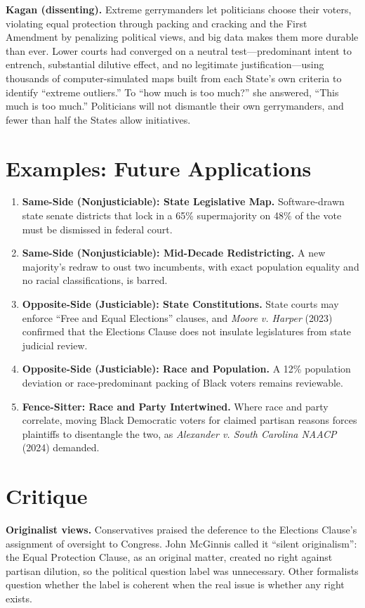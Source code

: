 \documentclass[12pt]{article}
\begin{document}
\textbf{Kagan (dissenting).} Extreme gerrymanders let politicians choose their voters, violating equal protection through packing and cracking and the First Amendment by penalizing political views, and big data makes them more durable than ever. Lower courts had converged on a neutral test---predominant intent to entrench, substantial dilutive effect, and no legitimate justification---using thousands of computer-simulated maps built from each State's own criteria to identify ``extreme outliers.'' To ``how much is too much?'' she answered, ``This much is too much.'' Politicians will not dismantle their own gerrymanders, and fewer than half the States allow initiatives.

\section{Examples: Future Applications}

\begin{enumerate}
\item \textbf{Same-Side (Nonjusticiable): State Legislative Map.} Software-drawn state senate districts that lock in a 65\% supermajority on 48\% of the vote must be dismissed in federal court.
\item \textbf{Same-Side (Nonjusticiable): Mid-Decade Redistricting.} A new majority's redraw to oust two incumbents, with exact population equality and no racial classifications, is barred.
\item \textbf{Opposite-Side (Justiciable): State Constitutions.} State courts may enforce ``Free and Equal Elections'' clauses, and \textit{Moore v. Harper} (2023) confirmed that the Elections Clause does not insulate legislatures from state judicial review.
\item \textbf{Opposite-Side (Justiciable): Race and Population.} A 12\% population deviation or race-predominant packing of Black voters remains reviewable.
\item \textbf{Fence-Sitter: Race and Party Intertwined.} Where race and party correlate, moving Black Democratic voters for claimed partisan reasons forces plaintiffs to disentangle the two, as \textit{Alexander v. South Carolina NAACP} (2024) demanded.
\end{enumerate}

\section{Critique}

\textbf{Originalist views.} Conservatives praised the deference to the Elections Clause's assignment of oversight to Congress. John McGinnis called it ``silent originalism'': the Equal Protection Clause, as an original matter, created no right against partisan dilution, so the political question label was unnecessary. Other formalists question whether the label is coherent when the real issue is whether any right exists.
\end{document}
